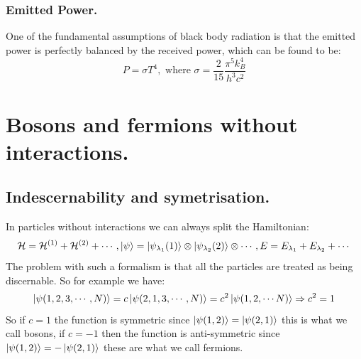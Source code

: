 \documentclass[10pt,a4paper]{book}
\begin{document}
\subsubsection{Emitted Power.}
One of the fundamental assumptions of black body radiation is that the emitted power is perfectly balanced by the received power, which can be found to be:
\[
P = \sigma T^4 , \text{ where } \sigma = \frac{2}{15} \frac{\pi^5 k_B^4}{h^3 c^2}
\]

\section{Bosons and fermions without interactions.}
\subsection{Indescernability and symetrisation.}
In particles without interactions we can always split the Hamiltonian:
\[
\mathcal{H} = \mathcal{H}^{(1)} + \mathcal{H}^{(2)} + \cdots, \ket \psi = \ket{\psi_{\lambda_1}(1)} \otimes \ket{\psi_{\lambda_2}(2) }\otimes \cdots, E = E_{\lambda_1} + E_{\lambda_2} + \cdots
\]
The problem with such a formalism is that all the particles are treated as being discernable. So for example we have:
\[
\ket{\psi(1, 2, 3, \cdots, N)} = c \ket{\psi(2, 1, 3, \cdots, N)} = c^2 \ket{\psi(1, 2, \cdots N)} \Rightarrow c^2 = 1
\]
So if $c = 1$ the function is symmetric since $\ket{\psi(1,2)} = \ket{\psi(2, 1)}$ this is what we call bosons, if $c = -1$ then the function is anti-symmetric since $\ket{\psi(1,2)} = -\ket{\psi(2, 1)}$ these are what we call fermions.
\end{document}
